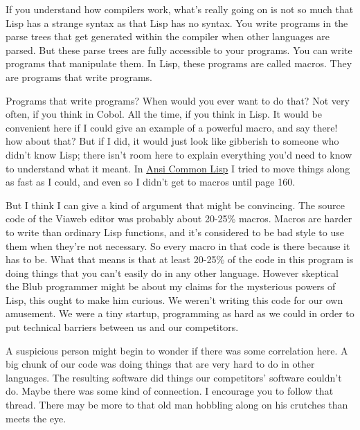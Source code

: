 If you understand how compilers work,
                  what's really going on is not so much that Lisp has a strange
                  syntax as that Lisp has no syntax. You write programs in the
                  parse trees that get generated within the compiler when other
                  languages are parsed. But these parse trees are fully
                  accessible to your programs. You can write programs that
                  manipulate them. In Lisp, these programs are called macros.
                  They are programs that write programs.

Programs
                  that write programs? When would you ever want to do that? Not
                  very often, if you think in Cobol. All the time, if you think
                  in Lisp. It would be convenient here if I could give an
                  example of a powerful macro, and say there! how about that?
                  But if I did, it would just look like gibberish to someone who
                  didn't know Lisp; there isn't room here to explain everything
                  you'd need to know to understand what it meant. In
                  \href{http://www.paulgraham.com/acl.html}{Ansi Common Lisp} I tried to move things
                  along as fast as I could, and even so I didn't get to macros
                  until page 160.

But I think I can give a kind of
                  argument that might be convincing. The source code of the
                  Viaweb editor was probably about 20-25\% macros. Macros are
                  harder to write than ordinary Lisp functions, and it's
                  considered to be bad style to use them when they're not
                  necessary. So every macro in that code is there because it has
                  to be. What that means is that at least 20-25\% of the code in
                  this program is doing things that you can't easily do in any
                  other language. However skeptical the Blub programmer might be
                  about my claims for the mysterious powers of Lisp, this ought
                  to make him curious. We weren't writing this code for our own
                  amusement. We were a tiny startup, programming as hard as we
                  could in order to put technical barriers between us and our
                  competitors.

A suspicious person might begin to
                  wonder if there was some correlation here. A big chunk of our
                  code was doing things that are very hard to do in other
                  languages. The resulting software did things our competitors'
                  software couldn't do. Maybe there was some kind of connection.
                  I encourage you to follow that thread. There may be more to
                  that old man hobbling along on his crutches than meets the
                  eye.

